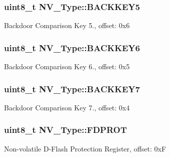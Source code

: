 \subsubsection[{\texorpdfstring{B\+A\+C\+K\+K\+E\+Y5}{BACKKEY5}}]{ uint8\+\_\+t N\+V\+\_\+\+Type\+::\+B\+A\+C\+K\+K\+E\+Y5}\hypertarget{structNV__Type_ae2121000a273d32aeeaf2f4100ea3471}{}\label{structNV__Type_ae2121000a273d32aeeaf2f4100ea3471}
Backdoor Comparison Key 5., offset\+: 0x6 
\subsubsection[{\texorpdfstring{B\+A\+C\+K\+K\+E\+Y6}{BACKKEY6}}]{ uint8\+\_\+t N\+V\+\_\+\+Type\+::\+B\+A\+C\+K\+K\+E\+Y6}\hypertarget{structNV__Type_a39aa00a01f54dd8348854da97790e930}{}\label{structNV__Type_a39aa00a01f54dd8348854da97790e930}
Backdoor Comparison Key 6., offset\+: 0x5 
\subsubsection[{\texorpdfstring{B\+A\+C\+K\+K\+E\+Y7}{BACKKEY7}}]{ uint8\+\_\+t N\+V\+\_\+\+Type\+::\+B\+A\+C\+K\+K\+E\+Y7}\hypertarget{structNV__Type_ade5b560a7ad515e084070fde57ea32d7}{}\label{structNV__Type_ade5b560a7ad515e084070fde57ea32d7}
Backdoor Comparison Key 7., offset\+: 0x4 
\subsubsection[{\texorpdfstring{F\+D\+P\+R\+OT}{FDPROT}}]{ uint8\+\_\+t N\+V\+\_\+\+Type\+::\+F\+D\+P\+R\+OT}\hypertarget{structNV__Type_a3d5374b1acb568cfe13bd843cf5272d8}{}\label{structNV__Type_a3d5374b1acb568cfe13bd843cf5272d8}
Non-\/volatile D-\/\+Flash Protection Register, offset\+: 0xF 
